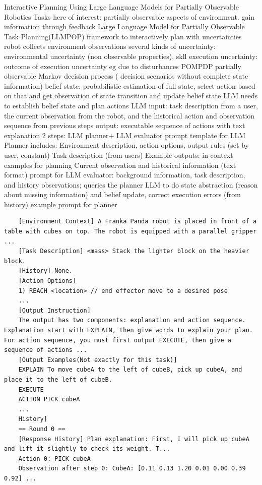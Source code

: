 \documentclass{article}
\begin{document}
\cite{sun_interactive_2023} Interactive Planning Using Large Language Models for Partially Observable Robotics Tasks
here of interest: partially observable aspects of environment. gain information through feedback
Large Language Model for Partially Observable Task Planning(LLMPOP) framework to interactively plan with uncertainties
robot collects environment observations
several kinds of uncertainty: environmental uncertainty (non observable properties), skll execution uncertainty: outcome of execution uncertainty eg due to disturbances
POMPDP partially observable Markov decision process ( decision scenarios without complete state information)
belief state: probabilistic estimation of full state, select action based on that and get observation of state transition and update belief state
LLM needs to establish belief state and plan actions
LLM input: task description from a user, the current observation from the robot, and the historical action and observation sequence from previous steps
output: executable sequence of actions with text explanation
2 steps: LLM planner+ LLM evaluator
prompt template for LLM Planner includes:
Environment description, action options, output rules (set by user, constant)
Task description (from users)
Example outputs: in-context examples for planning
Current observation and historical information (text format)
prompt for LLM evaluator: background information, task description, and history observations; queries the planner LLM to do state abstraction (reason about missing information) and belief update, correct execution errors (from history)
example prompt for planner
\begin{verbatim}
	[Environment Context] A Franka Panda robot is placed in front of a table with cubes on top. The robot is equipped with a parallel gripper ...
	[Task Description] <mass> Stack the lighter block on the heavier block. 
	[History] None.
	[Action Options] 
	1) REACH <location> // end effector move to a desired pose
	...
	[Output Instruction] 
	The output has two components: explanation and action sequence. Explanation start with EXPLAIN, then give words to explain your plan. For action sequence, you must first output EXECUTE, then give a sequence of actions ...
	[Output Examples(Not exactly for this task)] 
	EXPLAIN To move cubeA to the left of cubeB, pick up cubeA, and place it to the left of cubeB. 
	EXECUTE 
	ACTION PICK cubeA
	...
	History] 
	== Round 0 == 
	[Response History] Plan explanation: First, I will pick up cubeA and lift it slightly to check its weight. T... 
	Action 0: PICK cubeA 
	Observation after step 0: CubeA: [0.11 0.13 1.20 0.01 0.00 0.39 0.92] ...
\end{verbatim}
\end{document}

